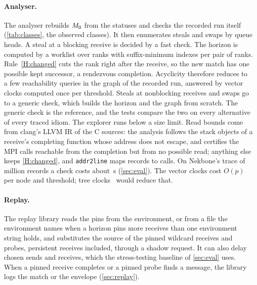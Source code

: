 \paragraph{Analyser.} The analyser rebuilds $M_0$ from the statuses and checks the
recorded run itself (\cref{tab:classes}, the observed classes). It then enumerates
steals and swaps by queue heads. A steal at a blocking receive is decided by a fast check.
The horizon is computed by a worklist over ranks with suffix-minimum indexes per pair of
ranks. Rule~\ref{H:changed} cuts the rank right after the receive, so the new match has one
possible kept successor, a rendezvous completion. Acyclicity therefore reduces to a few
reachability queries in the graph of the recorded run, answered by vector clocks computed
once per threshold. Steals at nonblocking receives and swaps go to a generic check, which
builds the horizon and the graph from scratch. The generic check is the reference, and the
tests compare the two on every alternative of every traced idiom. The \LoneSP explorer runs
below a size limit. Read bounds come from clang's LLVM IR of the C sources: the analysis
follows the stack objects of a receive's completing function whose address does not escape,
and certifies the MPI calls reachable from the completion but from no possible read; anything
else keeps \ref{H:changed}, and \texttt{addr2line} maps records to calls. On Nekbone's trace of \NekRecords million records a check costs about \NekPerAlt\,s
(\cref{sec:eval}). The vector clocks cost $O(p)$ per node and threshold; tree
clocks~\citep{mathur22treeclock} would reduce that.

\paragraph{Replay.} The replay library reads the pins from the environment, or from a file
the environment names when a horizon pins more receives than one environment string holds, and
substitutes the source of the pinned wildcard receives and probes, persistent receives
included, through a shadow request. It can also delay chosen sends and receives, which the
stress-testing baseline of \cref{sec:eval} uses. When a pinned receive completes or a pinned
probe finds a message, the library logs the match or the envelope (\cref{sec:replay}).
